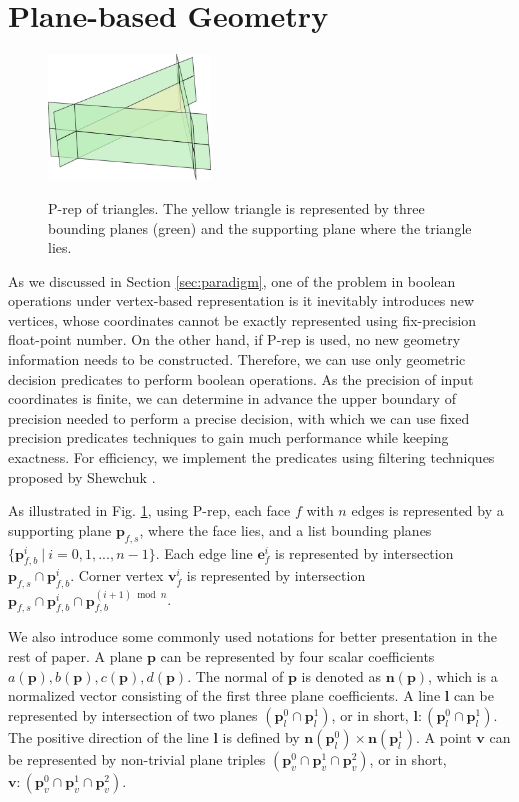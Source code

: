 \documentclass[10pt,journal,compsoc]{IEEEtran}
\begin{document}
\section{Plane-based Geometry}

\begin{figure}
  \centering
  \includegraphics[width=1.7in]{p-reps}\\
  \caption{P-rep of triangles. The yellow triangle is represented by three bounding planes (green) and the supporting plane where the triangle lies.}\label{fig:p-reps}
\end{figure}

As we discussed in Section \ref{sec:paradigm}, one of the problem in boolean operations under vertex-based representation is it inevitably introduces new vertices, whose coordinates cannot be exactly represented using fix-precision float-point number. On the other hand, if P-rep is used, no new geometry information needs to be constructed. Therefore, we can use only geometric decision predicates to perform boolean operations. As the precision of input coordinates is finite, we can determine in advance the upper boundary of precision needed to perform a precise decision, with which we can use fixed precision predicates techniques to gain much performance while keeping exactness. For efficiency, we implement the predicates using filtering techniques proposed by Shewchuk \cite{shewchuk1997adaptive}.

As illustrated in Fig. \ref{fig:p-reps}, using P-rep, each face $f$ with $n$ edges is represented by a supporting plane $\bm{p}_{f,s}$, where the face lies, and a list bounding planes $\{\bm{p}_{f,b}^i \ \vert\  i = 0, 1,...,n-1\}$. Each edge line $\bm{e}_f^i$ is represented by intersection $\bm{p}_{f,s} \cap \bm{p}_{f,b}^i$. Corner vertex $\bm{v}_f^i$ is represented by intersection $\bm{p}_{f,s} \cap \bm{p}_{f,b}^i \cap \bm{p}_{f,b}^{{(i+1)}\bmod{n}}$.

We also introduce some commonly used notations for better presentation in the rest of paper. A plane $\bm{p}$ can be represented by four scalar coefficients $a(\bm{p}), b(\bm{p}), c(\bm{p}), d(\bm{p})$. The normal of $\bm{p}$ is denoted as $\bm{n}(\bm{p})$, which is a normalized vector consisting of the first three plane coefficients. A line $\bm{l}$ can be represented by intersection of two planes $(\bm{p}_l^0 \cap \bm{p}_l^1)$, or in short, $\bm{l}\colon(\bm{p}_l^0 \cap \bm{p}_l^1)$. The positive direction of the line $\bm{l}$ is defined by $\bm{n}(\bm{p}_l^0) \times \bm{n}(\bm{p}_l^1)$. A point $\bm{v}$ can be represented by non-trivial plane triples $(\bm{p}_v^0 \cap \bm{p}_v^1 \cap \bm{p}_v^2)$, or in short, $\bm{v}\colon(\bm{p}_v^0 \cap \bm{p}_v^1 \cap \bm{p}_v^2)$.
\end{document}
